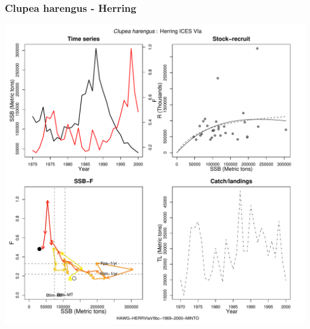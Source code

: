 \subsubsection{Clupea harengus - Herring}
\begin{center}
\includegraphics[width=1.2\textwidth]{../R/figures/HAWG-HERRVIaVIIbc-1969-2000-MINTO.pdf}
\end{center}

